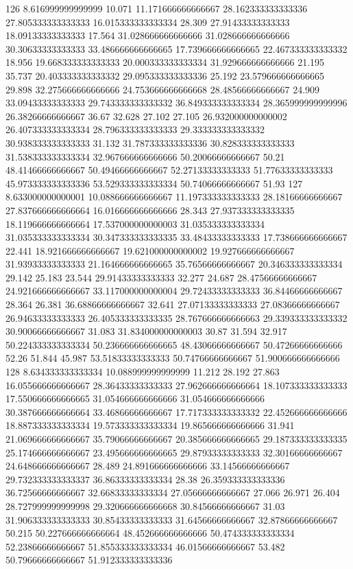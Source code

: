 126 8.616999999999999 10.071 11.171666666666667 28.162333333333336 27.805333333333333 16.015333333333334 28.309 27.91433333333333 18.09133333333333 17.564 31.028666666666666 31.028666666666666 30.30633333333333 33.486666666666665 17.739666666666665 22.467333333333332 18.956 19.668333333333333 20.000333333333334 31.929666666666666 21.195 35.737 20.403333333333332 29.095333333333336 25.192 23.579666666666665 29.898 32.275666666666666 24.753666666666668 28.48566666666667 24.909 33.09433333333333 29.743333333333332 36.849333333333334 28.365999999999996 26.38266666666667 36.67 32.628 27.102 27.105 26.932000000000002 26.407333333333334 28.796333333333333 29.333333333333332 30.938333333333333 31.132 31.787333333333336 30.828333333333333 31.538333333333334 32.967666666666666 50.20066666666667 50.21 48.41466666666667 50.49466666666667 52.27133333333333 51.77633333333333 45.973333333333336 53.529333333333334 50.74066666666667 51.93
127 8.633000000000001 10.088666666666667 11.197333333333333 28.18166666666667 27.837666666666664 16.016666666666666 28.343 27.937333333333335 18.119666666666664 17.537000000000003 31.035333333333334 31.035333333333334 30.347333333333335 33.48433333333333 17.738666666666667 22.441 18.921666666666667 19.621000000000002 19.927666666666667 31.93933333333333 21.164666666666665 35.76566666666667 20.346333333333334 29.142 25.183 23.544 29.91433333333333 32.277 24.687 28.47566666666667 24.921666666666667 33.117000000000004 29.72433333333333 36.84466666666667 28.364 26.381 36.68866666666667 32.641 27.07133333333333 27.08366666666667 26.94633333333333 26.405333333333335 28.767666666666663 29.339333333333332 30.90066666666667 31.083 31.834000000000003 30.87 31.594 32.917 50.224333333333334 50.236666666666665 48.43066666666667 50.47266666666666 52.26 51.844 45.987 53.51833333333333 50.74766666666667 51.900666666666666
128 8.634333333333334 10.088999999999999 11.212 28.192 27.863 16.055666666666667 28.36433333333333 27.962666666666664 18.107333333333333 17.550666666666665 31.054666666666666 31.054666666666666 30.387666666666664 33.46866666666667 17.717333333333332 22.452666666666666 18.887333333333334 19.573333333333334 19.865666666666666 31.941 21.069666666666667 35.79066666666667 20.385666666666665 29.187333333333335 25.174666666666667 23.495666666666665 29.87933333333333 32.30166666666667 24.648666666666667 28.489 24.891666666666666 33.14566666666667 29.732333333333337 36.86333333333334 28.38 26.359333333333336 36.72566666666667 32.66833333333334 27.05666666666667 27.066 26.971 26.404 28.727999999999998 29.320666666666668 30.84566666666667 31.03 31.906333333333333 30.85433333333333 31.64566666666667 32.87866666666667 50.215 50.227666666666664 48.452666666666666 50.474333333333334 52.23866666666667 51.855333333333334 46.01566666666667 53.482 50.79666666666667 51.912333333333336
